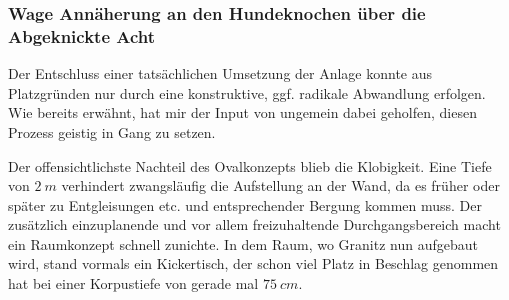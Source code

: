 \subsubsection{Wage Ann\"aherung an den Hundeknochen \"uber die Abgeknickte Acht}
\label{sec:map_development_state2}

Der Entschluss einer tats\"achlichen Umsetzung der Anlage konnte aus Platzgr\"unden nur durch eine konstruktive, ggf. radikale Abwandlung erfolgen.
Wie bereits erw\"ahnt, hat mir der Input von \cite{Gee17} ungemein dabei geholfen, diesen Prozess geistig in Gang zu setzen.

Der offensichtlichste Nachteil des Ovalkonzepts blieb die Klobigkeit.
Eine Tiefe von $2~m$ verhindert zwangsl\"aufig die Aufstellung an der Wand, da es fr\"uher oder sp\"ater zu Entgleisungen etc. und entsprechender Bergung kommen muss.
Der zus\"atzlich einzuplanende und vor allem freizuhaltende Durchgangsbereich macht ein Raumkonzept schnell zunichte.
In dem Raum, wo Granitz nun aufgebaut wird, stand vormals ein Kickertisch, der schon viel Platz in Beschlag genommen hat bei einer Korpustiefe von gerade mal $75~cm$.

